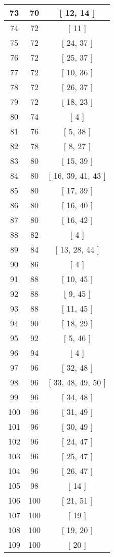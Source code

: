 \begin{center}
\begin{longtable}[H]{|| c c c ||}
73 & 70 & [ 12, 14 ] \\ 
\hline
74 & 72 & [ 11 ] \\ 
\hline
75 & 72 & [ 24, 37 ] \\ 
\hline
76 & 72 & [ 25, 37 ] \\ 
\hline
77 & 72 & [ 10, 36 ] \\ 
\hline
78 & 72 & [ 26, 37 ] \\ 
\hline
79 & 72 & [ 18, 23 ] \\ 
\hline
80 & 74 & [ 4 ] \\ 
\hline
81 & 76 & [ 5, 38 ] \\ 
\hline
82 & 78 & [ 8, 27 ] \\ 
\hline
83 & 80 & [ 15, 39 ] \\ 
\hline
84 & 80 & [ 16, 39, 41, 43 ] \\ 
\hline
85 & 80 & [ 17, 39 ] \\ 
\hline
86 & 80 & [ 16, 40 ] \\ 
\hline
87 & 80 & [ 16, 42 ] \\ 
\hline
88 & 82 & [ 4 ] \\ 
\hline
89 & 84 & [ 13, 28, 44 ] \\ 
\hline
90 & 86 & [ 4 ] \\ 
\hline
91 & 88 & [ 10, 45 ] \\ 
\hline
92 & 88 & [ 9, 45 ] \\ 
\hline
93 & 88 & [ 11, 45 ] \\ 
\hline
94 & 90 & [ 18, 29 ] \\ 
\hline
95 & 92 & [ 5, 46 ] \\ 
\hline
96 & 94 & [ 4 ] \\ 
\hline
97 & 96 & [ 32, 48 ] \\ 
\hline
98 & 96 & [ 33, 48, 49, 50 ] \\ 
\hline
99 & 96 & [ 34, 48 ] \\ 
\hline
100 & 96 & [ 31, 49 ] \\ 
\hline
101 & 96 & [ 30, 49 ] \\ 
\hline
102 & 96 & [ 24, 47 ] \\ 
\hline
103 & 96 & [ 25, 47 ] \\ 
\hline
104 & 96 & [ 26, 47 ] \\ 
\hline
105 & 98 & [ 14 ] \\ 
\hline
106 & 100 & [ 21, 51 ] \\ 
\hline
107 & 100 & [ 19 ] \\ 
\hline
108 & 100 & [ 19, 20 ] \\ 
\hline
109 & 100 & [ 20 ] \\ 

\end{longtable}
\end{center}
